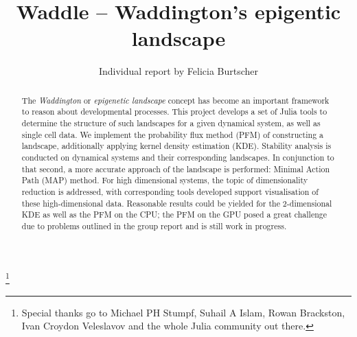 \documentclass[journal, a4paper]{IEEEtran}
\begin{document}
	\title{Waddle -- Waddington's epigentic landscape}
	\author{Individual report by Felicia Burtscher}
	\thanks{Special thanks go to Michael PH Stumpf, Suhail A Islam, Rowan Brackston, Ivan Croydon Veleslavov and the whole Julia community out there.}\\
	
\maketitle


\begin{abstract}
The \textit{Waddington} or \textit{epigenetic landscape} concept has become an important framework to reason about developmental processes. This project develops a set of Julia tools to determine the structure of such landscapes for a given dynamical system, as well as single cell data. We implement the probability flux method (PFM) of constructing a landscape, additionally applying kernel density estimation (KDE). Stability analysis is conducted on dynamical systems and their corresponding landscapes. In conjunction to that second, a more accurate approach %
of the landscape is performed: Minimal Action Path (MAP) method. %
For high dimensional systems, the topic of dimensionality reduction is addressed, with corresponding tools developed support visualisation of these high-dimensional data.
Reasonable results could be yielded for the 2-dimensional KDE as well as the PFM on the CPU; the PFM on the GPU posed a great challenge due to problems outlined in the group report and is still work in progress.


\end{abstract}

\end{document}
